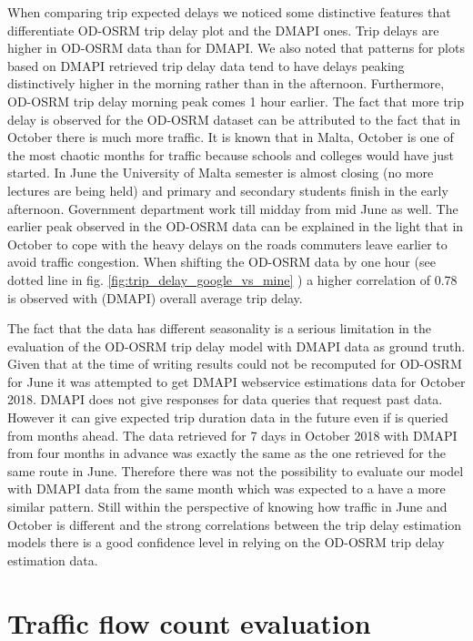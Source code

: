 \documentclass[12pt, a4paper]{report}
\theoremstyle{definition}
\theoremstyle{definition}%
\theoremstyle{definition}%
\theoremstyle{definition}%
\theoremstyle{definition}%
\theoremstyle{definition}%
\begin{document}
When comparing trip expected delays we noticed some distinctive features that differentiate OD-OSRM trip delay plot and the DMAPI ones. Trip delays are higher in OD-OSRM data than for DMAPI. We also noted that patterns for plots based on DMAPI retrieved trip delay data tend to have delays peaking distinctively higher in the morning rather than in the afternoon. Furthermore, OD-OSRM trip delay morning peak comes 1 hour earlier. The fact that more trip delay is observed for the OD-OSRM dataset can be attributed to the fact that in October there is much more traffic. It is known that in Malta, October is one of the most chaotic months for traffic because schools and colleges would have just started. In June the University of Malta semester is almost closing (no more lectures are being held) and primary and secondary students finish in the early afternoon. Government department work till midday from mid June as well. The earlier peak observed in the OD-OSRM data can be explained in the light that in October to cope with the heavy delays on the roads commuters leave earlier to avoid traffic congestion. When shifting the OD-OSRM data by one hour (see dotted line in fig. \ref{fig:trip_delay_google_vs_mine} ) a higher correlation of 0.78 is observed with (DMAPI) overall average trip delay.

The fact that the data has different seasonality is a serious limitation in the evaluation of the OD-OSRM trip delay model with DMAPI data as ground truth. Given that at the time of writing results could not be recomputed for OD-OSRM for June it was attempted to get DMAPI webservice estimations data for October 2018. DMAPI does not give responses for data queries that request past data. However it can give expected trip duration data in the future even if is queried from months ahead. The data retrieved for 7 days in October 2018 with DMAPI from four months in advance was exactly the same as the one retrieved for the same route in June. Therefore there was not the possibility to evaluate our model with DMAPI data from the same month which was expected to a have a more similar pattern. Still within the perspective of knowing how traffic in June and October is different and the strong correlations between the trip delay estimation models there is a good confidence level in relying on the OD-OSRM trip delay estimation data.	

\section{Traffic flow count evaluation} \label{section:traffic_flow_evaluation}
\end{document}
